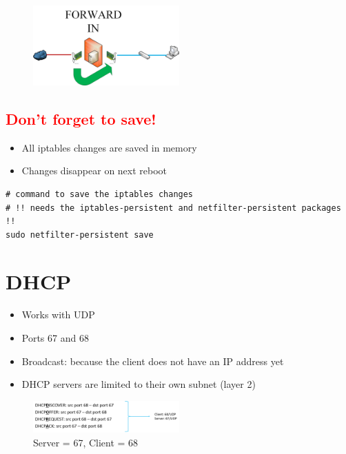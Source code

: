 \documentclass{article}
\begin{document}
\begin{figure}[H]
    \centering
    \includegraphics[width=0.5\textwidth]{forward-in-chain.jpg}
\end{figure}


\subsection{\textcolor{red}{Don't forget to save!}}

\begin{itemize}
    \item All iptables changes are saved in memory
    \item Changes disappear on next reboot
\end{itemize}

\begin{verbatim}
# command to save the iptables changes
# !! needs the iptables-persistent and netfilter-persistent packages !!
sudo netfilter-persistent save
\end{verbatim}

\section{DHCP}

\begin{itemize}
    \item Works with UDP
    \item Ports 67 and 68
    \item Broadcast: because the client does not have an IP address yet
    \item DHCP servers are limited to their own subnet (layer 2)
\end{itemize}

\begin{figure}[H]
    \centering
    \includegraphics[width=0.5\textwidth]{dhcp-dora.png}
    \caption{Server = 67, Client = 68}
\end{figure}
\end{document}
